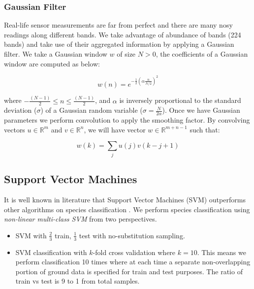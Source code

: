 \documentclass[remotesensing,article,accept,moreauthors,pdftex,12pt,a4paper]{mdpi}
\begin{document}
\subsubsection{Gaussian Filter}

Real-life sensor measurements are far from perfect and there are many nosy readings along different bands. We take advantage of abundance of bands (224 bands) and take use of their aggregated information by applying a Gaussian filter. We take a Gaussian window $w$ of size $N > 0$, the coefficients of a Gaussian window are computed as below:

\begin{equation}
w(n) = e^{-\frac{1}{2}(\alpha \frac{n}{N/2})^2}
\end{equation}  

where $-\frac{(N-1)}{2} \leq n \leq \frac{(N-1)}{2}$, and $\alpha$ is inversely proportional to the standard deviation ($\sigma$) of a Gaussian random variable ($\sigma = \frac{N}{2\alpha}$). Once we have Gaussian parameters we perform convolution to apply the smoothing factor. By convolving vectors $u \in \mathbb{R}^m$ and $v\in \mathbb{R}^n$, we will have vector $w\in \mathbb{R}^{m+n-1}$ such that: 

\begin{equation}
w(k)=\sum_j u(j)v(k-j+1)
\end{equation} 


\subsection{Support Vector Machines}

It is well known in literature that Support Vector Machines (SVM) outperforms other algorithms on species classification \cite{colgan2012mapping, baldeck2014landscape, cho2012mapping}. We perform species classification using \textit{non-linear multi-class SVM} from two perspectives. 


\begin{itemize}
\item SVM with $\frac{2}{3}$ train, $\frac{1}{3}$ test with no-substitution sampling.
\item SVM classification with $k$-fold cross validation where $k=10$. This means we perform classification 10 times where at each time a separate non-overlapping portion of ground data is specified for train and test purposes. The ratio of train vs test is 9 to 1 from total samples.
\end{itemize}
\end{document}
